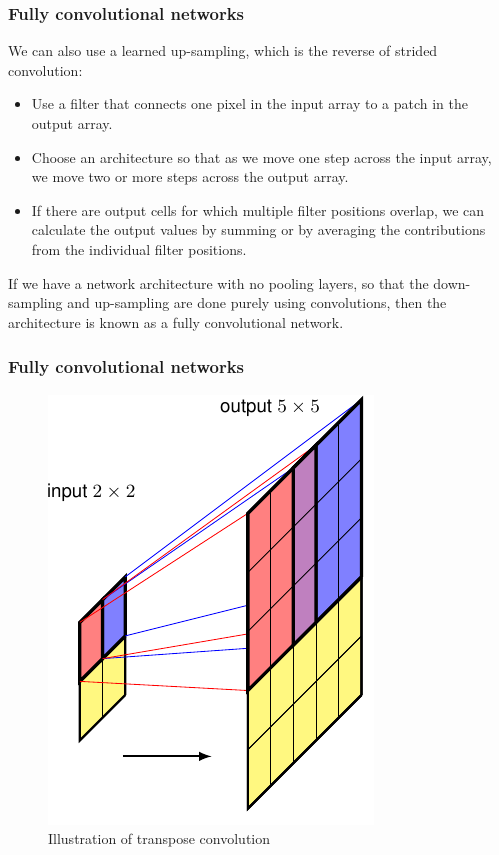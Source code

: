 \documentclass{beamer}
\begin{document}
\begin{frame}
    \frametitle{Fully convolutional networks}
    We can also use a learned up-sampling, which is the reverse of strided convolution:
    \begin{itemize}
        \item Use a filter that connects one pixel in the input array to a patch in the output array.
        \item Choose an architecture so that as we move one step across the input array, we move two or more steps across the output array.
        \item If there are output cells for which multiple filter positions overlap, we can calculate the output values by summing or by averaging the contributions from the individual filter positions.
    \end{itemize}
    If we have a network architecture with no pooling layers, so that the down-sampling and up-sampling are done purely using convolutions, then the architecture is known as a fully convolutional network.
\end{frame}

\begin{frame}
    \frametitle{Fully convolutional networks}
    \begin{figure}
        \caption{Illustration of transpose convolution}
        \includegraphics[height=0.7\textheight]{Figure_30.pdf}
    \end{figure}
\end{frame}
\end{document}
